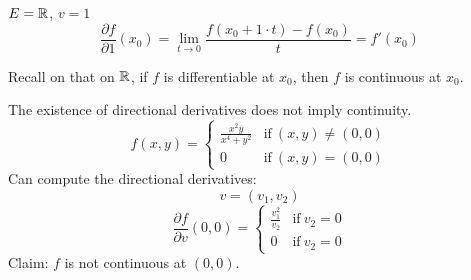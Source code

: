 \documentclass[11pt]{article}
\newcommand{\ra}{\rightarrow}
\begin{document}
\begin{example}
    $E = \mathbb{R}$, $v = 1$
    \[\frac{\partial f}{\partial 1}(x_0) = \lim_{t \ra 0}\frac{f(x_0 + 1\cdot t)-f(x_0)}{t}= f'(x_0)\] 
\end{example}

Recall on that on $\mathbb{R}$, if $f$ is differentiable at $x_0$, then $f$ is continuous at $x_0$. 
\begin{example}
    The existence of directional derivatives does not imply continuity. 
    \[f(x,y) = 
    \begin{cases}
        \frac{x^2y}{x^4 + y^2} & \text{if} \ (x,y) \neq (0,0) \\
        0 & \text{if} \ (x,y) = (0,0)
    \end{cases}
    \]
    Can compute the directional derivatives:
    \[v = (v_1, v_2)\]
    \[\frac{\partial f}{\partial v} (0,0) = 
    \begin{cases}
        \frac{v_1^2}{v_2} & \text{if} \ v_2 = 0 \\
        0 & \text{if} \ v_2 = 0
    \end{cases} \]
    Claim: $f$ is not continuous at $(0,0)$. 
\end{example}
\end{document}

